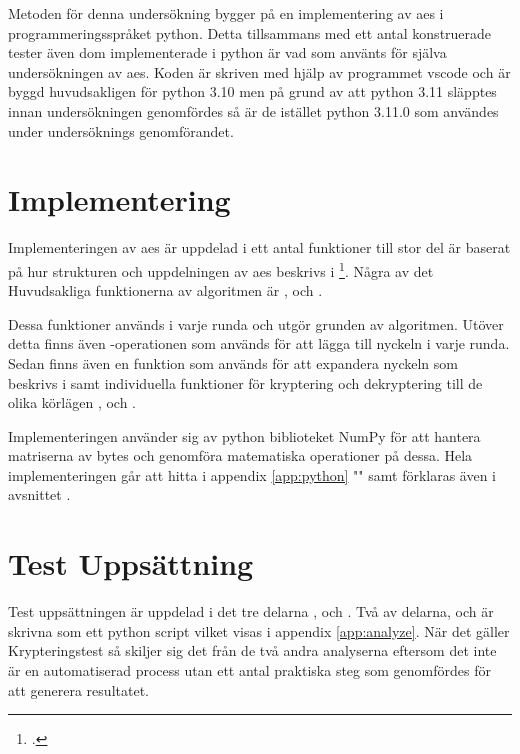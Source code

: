 Metoden för denna undersökning bygger på en implementering av \acrshort{aes} i programmeringsspråket
\gls{python}. Detta tillsammans med ett antal konstruerade tester även dom implementerade i
\gls{python} är vad som använts för själva undersökningen av \acrshort{aes}. Koden
är skriven med hjälp av programmet \gls{vscode} och är byggd huvudsakligen för \gls{python} 3.10 men
på grund av att \gls{python} 3.11 släpptes innan undersökningen genomfördes så är de istället \gls{python} 3.11.0
som användes under undersöknings genomförandet.

\section{Implementering} %
Implementeringen av \acrshort{aes} är uppdelad i ett antal funktioner till stor del är baserat på
hur strukturen och uppdelningen av \acrshort{aes} beskrivs i \footcite{daemen1999aes}.
Några av det Huvudsakliga funktionerna av algoritmen är ,  och
.

Dessa funktioner används i varje runda och utgör grunden av algoritmen. Utöver detta finns
även -operationen som används för att lägga till nyckeln i varje runda. Sedan finns även
en funktion som används för att expandera nyckeln som beskrivs i  samt
individuella funktioner för kryptering och dekryptering till de olika körlägen ,  och
.

Implementeringen använder sig av \gls{python} biblioteket NumPy för att hantera matriserna av \gls{byte}s och genomföra
matematiska operationer på dessa. Hela implementeringen går att hitta i appendix \ref{app:python} "" samt
förklaras även i avsnittet .

\section{Test Uppsättning} %
Test uppsättningen är uppdelad i det tre delarna ,  och . Två av delarna,  och
 är skrivna som ett \gls{python} script vilket visas i appendix \ref{app:analyze}. När det gäller Krypteringstest så skiljer sig det från de två andra analyserna eftersom det
inte är en automatiserad process utan ett antal praktiska steg som genomfördes för att generera resultatet.

